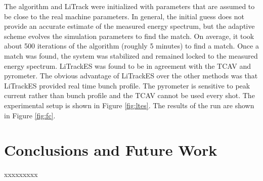 \documentclass[%
twocolumn,
showpacs,preprintnumbers,
 aps,
prstab,
]{revtex4-1}
\begin{document}
The algorithm and LiTrack were initialized with parameters that are assumed to be close to the real machine parameters. In general, the initial guess does not provide an accurate estimate of the measured energy spectrum, but the adaptive scheme evolves the simulation parameters to find the match. On average, it took about 500 iterations of the algorithm (roughly 5 minutes) to find a match. Once a match was found, the system was stabilized and remained locked to the measured energy spectrum. LiTrackES was found to be in agreement with the TCAV and pyrometer. The obvious advantage of LiTrackES over the other methods was that LiTrackES provided real time bunch profile. The pyrometer is sensitive to peak current rather than bunch profile and the TCAV cannot be used every shot. The experimental setup is shown in Figure \ref{fig:ltes}. The results of the run are shown in Figure \ref{fig:fc}.



\section{Conclusions and Future Work} \label{sec:con}


xxxxxxxxx



\end{document}
